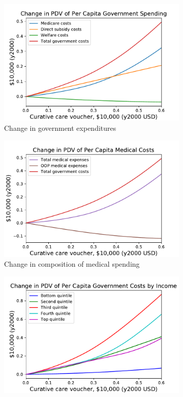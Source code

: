 \documentclass[12pt,pdftex,letterpaper]{article}
\begin{document}
\begin{figure}[h!]
    \centering
    \begin{subfigure}[b]{0.49\textwidth}
        \centering
        \includegraphics[width=\textwidth]{../Figures/CurativeSubGovtChange.pdf}
        \caption{Change in government expenditures}
    \end{subfigure}
    \begin{subfigure}[b]{0.49\textwidth}
        \centering
        \includegraphics[width=\textwidth]{../Figures/CurativeSubMedChange.pdf}
        \caption{Change in composition of medical spending}
    \end{subfigure}
    \begin{subfigure}[b]{0.49\textwidth}
        \centering
        \includegraphics[width=\textwidth]{../Figures/CurativeSubGovtChangeByInc.pdf}

\end{subfigure}
\end{figure}
\end{document}

